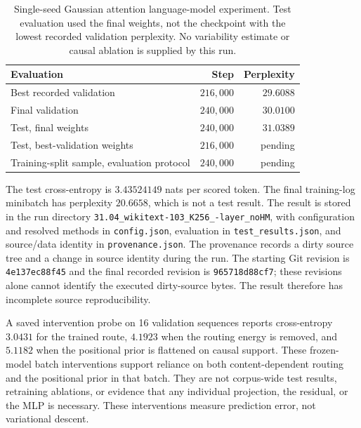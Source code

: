 \documentclass[twoside,11pt]{article}
\begin{document}
\begin{table}[H]
\centering
\begin{tabular}{lrr}
\toprule
Evaluation & Step & Perplexity \\
\midrule
Best recorded validation & $216{,}000$ & $29.6088$ \\
Final validation & $240{,}000$ & $30.0100$ \\
Test, final weights & $240{,}000$ & $31.0389$ \\
Test, best-validation weights & $216{,}000$ & pending \\ %
Training-split sample, evaluation protocol & $240{,}000$ & pending \\ %
\bottomrule
\end{tabular}
\caption{Single-seed Gaussian attention language-model experiment. Test evaluation used the final weights, not the checkpoint with the lowest recorded validation perplexity. No variability estimate or causal ablation is supplied by this run.}
\label{tab:relational_run}
\end{table}

The test cross-entropy is $3.43524149$ nats per scored token. The final training-log minibatch has perplexity $20.6658$, which is not a test result. The result is stored in the run directory \texttt{31.04\_\allowbreak wikitext-103\_\allowbreak K256\_-layer\_\allowbreak noHM}, with configuration and resolved methods in \texttt{config.json}, evaluation in \texttt{test\_\allowbreak results.json}, and source/data identity in \texttt{provenance.json}. The provenance records a dirty source tree and a change in source identity during the run. The starting Git revision is \texttt{4e137ec88f45} and the final recorded revision is \texttt{965718d88cf7}; these revisions alone cannot identify the executed dirty-source bytes. The result therefore has incomplete source reproducibility.

A saved intervention probe on 16 validation sequences reports cross-entropy $3.0431$ for the trained route, $4.1923$ when the routing energy is removed, and $5.1182$ when the positional prior is flattened on causal support. These frozen-model batch interventions support reliance on both content-dependent routing and the positional prior in that batch. They are not corpus-wide test results, retraining ablations, or evidence that any individual projection, the residual, or the MLP is necessary. These interventions measure prediction error, not variational descent.
\end{document}
